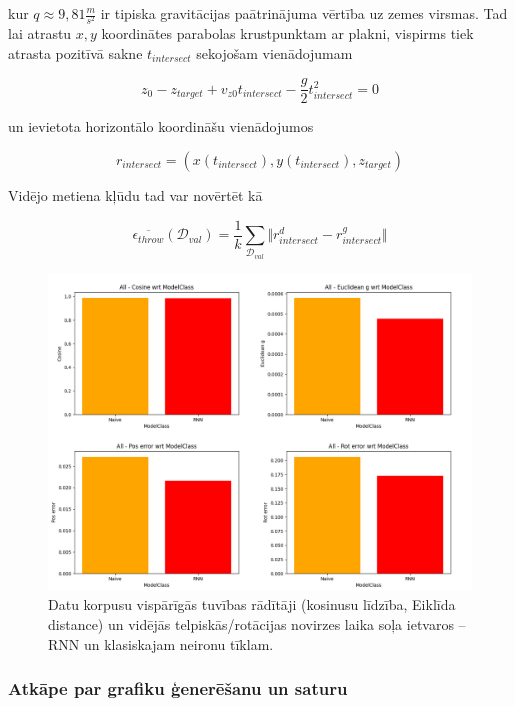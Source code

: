 \documentclass[12pt, a4paper]{article}
\numberwithin{equation}{section} %
\begin{document}
kur $q \approx 9,81 \frac{m}{s^2}$ ir tipiska gravitācijas paātrinājuma vērtība uz zemes virsmas. Tad lai atrastu $x,y$ koordinātes parabolas krustpunktam ar plakni, vispirms tiek atrasta pozitīvā sakne $t_{intersect}$ sekojošam vienādojumam

\begin{equation}
    z_0 - z_{target} + v_{z0}t_{intersect} - \frac{g}{2}t_{intersect}^2 = 0
\end{equation}

un ievietota horizontālo koordināšu vienādojumos

\begin{equation}
    r_{intersect} = \left ( x(t_{intersect}), y(t_{intersect}), z_{target} \right )
\end{equation}

Vidējo metiena kļūdu tad var novērtēt kā

\begin{equation}
    \overline{\epsilon_{throw}}(\mathcal{D}_{val}) = \frac{1}{k} \sum_{\mathcal{D}_{val}}
    \Vert r^d_{intersect} - r^g_{intersect} \Vert 
\end{equation}

\begin{figure}[t!]
    \centering
    \includegraphics[width=16cm,page=1]{../img/rnn-naive-global-stepwise.png}
    \caption{Datu korpusu vispārīgās tuvības rādītāji (kosinusu līdzība, Eiklīda distance) un vidējās telpiskās/rotācijas novirzes laika soļa ietvaros -- RNN un klasiskajam neironu tīklam.}
\end{figure}

\subsubsection{Atkāpe par grafiku ģenerēšanu un saturu}
\end{document}

